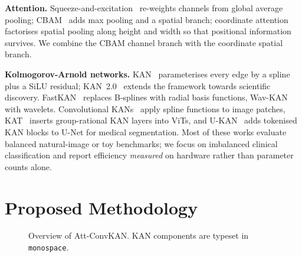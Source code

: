 \documentclass[conference]{IEEEtran}
\newcommand{\ours}{Att-ConvKAN}
\begin{document}
\textbf{Attention.} Squeeze-and-excitation~\cite{hu2018senet} re-weights channels from global average pooling; CBAM~\cite{woo2018cbam} adds max pooling and a spatial branch; coordinate attention~\cite{hou2021coordatt} factorises spatial pooling along height and width so that positional information survives. We combine the CBAM channel branch with the coordinate spatial branch.

\textbf{Kolmogorov-Arnold networks.} KAN~\cite{liu2025kan} parameterises every edge by a spline plus a SiLU residual; KAN~2.0~\cite{liu2024kan2} extends the framework towards scientific discovery. FastKAN~\cite{li2024fastkan} replaces B-splines with radial basis functions, Wav-KAN~\cite{bozorgasl2024wavkan} with wavelets. Convolutional KANs~\cite{bodner2024convkan,drokin2024kanconv} apply spline functions to image patches, KAT~\cite{yang2025kat} inserts group-rational KAN layers into ViTs, and U-KAN~\cite{li2025ukan} adds tokenised KAN blocks to U-Net for medical segmentation. Most of these works evaluate balanced natural-image or toy benchmarks; we focus on imbalanced clinical classification and report efficiency \emph{measured} on hardware rather than parameter counts alone.

\section{Proposed Methodology}
\begin{figure}[!t]
\centering
\setlength{\fboxsep}{4pt}
\caption{Overview of \ours. KAN components are typeset in \texttt{monospace}.}
\label{fig:arch}
\end{figure}
\end{document}
